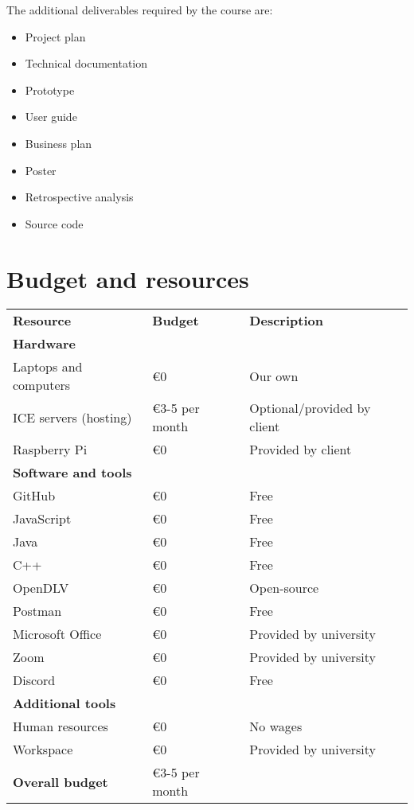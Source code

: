\noindent
The additional deliverables required by the course are:

\begin{itemize}
	\item Project plan
	\item Technical documentation
	\item Prototype
	\item User guide
	\item Business plan
	\item Poster
	\item Retrospective analysis
	\item Source code
\end{itemize}

\section{Budget and resources}\label{sec:budget}

\begin{table}[H]
	\centering
	\begin{tabularx}{\textwidth}{ l l X }
		\textbf{Resource} & \textbf{Budget} & \textbf{Description} \\
		\rowcolor[HTML]{C0C0C0}
		\textbf{Hardware} & & \\
		Laptops and computers & €0 & Our own \\
		\rowcolor[HTML]{E7E7E7}
		ICE servers (hosting) & €3-5 per month & Optional/provided by client \\
		Raspberry Pi & €0 & Provided by client \\
		\rowcolor[HTML]{C0C0C0}
		\textbf{Software and tools} & & \\
		GitHub & €0 & Free \\
		\rowcolor[HTML]{E7E7E7}
		JavaScript & €0 & Free \\
        Java & €0 & Free \\
		C++ & €0 & Free \\
		\rowcolor[HTML]{E7E7E7}
		OpenDLV & €0 & Open-source \\
		Postman & €0 & Free \\
		\rowcolor[HTML]{E7E7E7}
		Microsoft Office & €0 & Provided by university \\
		Zoom & €0 & Provided by university \\
		\rowcolor[HTML]{E7E7E7}
		Discord & €0 & Free \\
		\rowcolor[HTML]{C0C0C0}
		\textbf{Additional tools} & & \\
		Human resources & €0 & No wages \\
		\rowcolor[HTML]{E7E7E7}
		Workspace & €0 & Provided by university \\
		\rowcolor[HTML]{C0C0C0}
		\textbf{Overall budget} & €3-5 per month & \\
	\end{tabularx}
	\label{table:f-req-1}
\end{table}

